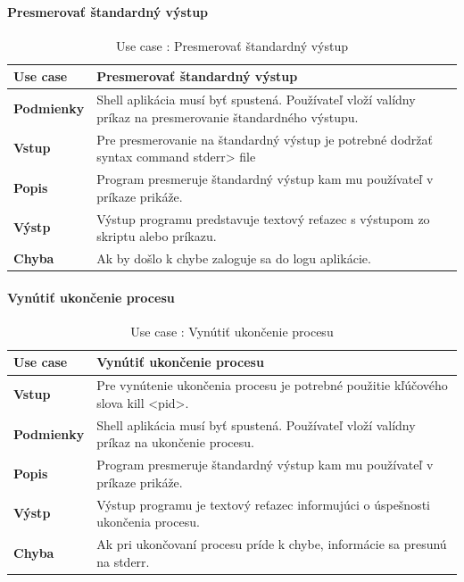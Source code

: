 \paragraph{Presmerovať štandardný výstup}
\begin{center}
	\begin{table}[htbp]
		\begin{tabular}{|p{2.5cm}|p{14cm}|}
			\hline
			\textbf{Use case} & Presmerovať štandardný výstup \\ 
			\hline
			\textbf{Podmienky} & Shell aplikácia musí byť spustená. Používateľ vloží valídny príkaz na presmerovanie štandardného výstupu. \\ 
			\hline
			\textbf{Vstup} & Pre presmerovanie na štandardný výstup je potrebné dodržať syntax command stderr> file\\
			\hline
			\textbf{Popis} & Program presmeruje štandardný výstup kam mu používateľ v príkaze prikáže.\\ 
			\hline
			\textbf{Výstp} & Výstup programu predstavuje textový reťazec s výstupom zo skriptu alebo príkazu.\\
			\hline
			\textbf{Chyba} & Ak by došlo k chybe zaloguje sa do logu aplikácie.\\
			\hline
		\end{tabular}
		\label{table:1}
		\caption{Use case : Presmerovať štandardný výstup }
	\end{table}
\end{center}
\newpage
\paragraph{Vynútiť ukončenie procesu}
\begin{center}
	\begin{table}[htbp]
		\begin{tabular}{|p{2.5cm}|p{14cm}|}
			\hline
			\textbf{Use case} & Vynútiť ukončenie procesu \\ 
			\hline
			\textbf{Vstup} & Pre vynútenie ukončenia procesu je potrebné použitie kľúčového slova kill <pid>.\\
			\hline
			\textbf{Podmienky} & Shell aplikácia musí byť spustená. Používateľ vloží valídny príkaz na ukončenie procesu. \\ 
			\hline
			\textbf{Popis} & Program presmeruje štandardný výstup kam mu používateľ v príkaze prikáže.\\ 
			\hline
			\textbf{Výstp} & Výstup programu je textový reťazec informujúci o úspešnosti ukončenia procesu.\\
			\hline
			\textbf{Chyba} & Ak pri ukončovaní procesu príde k chybe, informácie sa presunú na stderr.\\
			\hline
		\end{tabular}
		\label{table:1}
		\caption{Use case : Vynútiť ukončenie procesu}
	\end{table}
\end{center}

